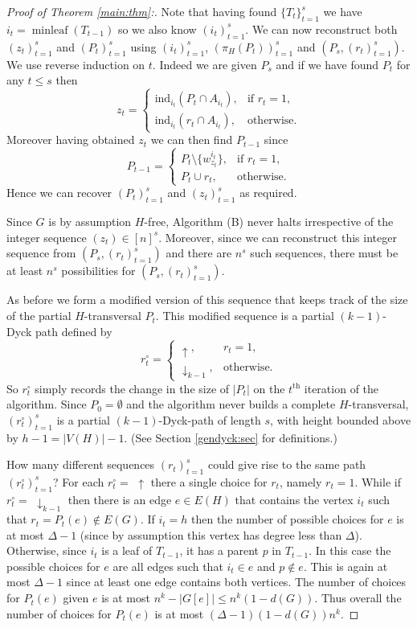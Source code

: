 \documentclass[12]{article}
\def\tr{\textrm}
\def\ind{\mathrm{ind}}
\def\dycku{\uparrow}
\def\dyckk{\downarrow_{k-1}}
\DeclareMathOperator{\minl}{minleaf}
\begin{document}
\begin{proof}[Proof of Theorem \ref{main:thm}:]
Note that having found $\{T_t\}_{t=1}^s$  we have $i_t=\minl(T_{t-1})$ so we also know $(i_t)_{t=1}^s$.
We can now reconstruct both $(z_t)_{t=1}^s$ and $(P_t)_{t=1}^s$ using  $(i_t)_{t=1}^s$, $(\pi_H(P_t))_{t=1}^s$ and $(P_s,(r_t)_{t=1}^s)$. We use reverse induction on $t$.
Indeed we are given $P_s$ and if we have found $P_t$ for any  $t\leq s$ then 
\[
z_t=\left\{
\begin{array}{ll}
\ind_{i_t}(P_t\cap A_{i_t}),& \textrm{if }r_{t}=1,\\
\ind_{i_t}(r_t \cap A_{i_t}),&\textrm{otherwise.}
\end{array}\right.\]
Moreover having obtained $z_t$ we can then find $P_{t-1}$ since
\[
P_{t-1}=\left\{
\begin{array}{ll}
P_t\setminus \{w_{z_t}^{i_t}\},& \textrm{if }r_{t}=1,\\
P_t\cup r_t,&\textrm{otherwise.}
\end{array}\right.\]
Hence we can recover $(P_t)_{t=1}^s$ and $(z_t)_{t=1}^s$ as required.

Since $G$ is by assumption $H$-free, Algorithm (B) never halts irrespective of the integer sequence $(z_t)\in[n]^s$. Moreover, since we can reconstruct this integer sequence from $(P_s,(r_t)_{t=1}^s)$ and there are $n^s$ such sequences,  there must be at least $n^s$ possibilities for $(P_s,(r_t)_{t=1}^s)$. 

As before we form a modified version of this sequence that keeps track of the size of the partial $H$-transversal $P_t$. This modified sequence  is a partial $(k-1)$-Dyck path defined by \[
r^\circ_t=\left\{
\begin{array}{ll}
  \dycku,& r_t=1,\\
  \dyckk,& \textrm{otherwise.} \end{array}\right.\] So $r_t^\circ$ simply records the change in the size of $|P_t|$ on the $t^\tr{th}$ iteration of the algorithm. Since $P_0=\emptyset$ and the algorithm never builds a complete $H$-transversal, $(r_t^\circ)_{t=1}^s$ is a partial $(k-1)$-Dyck-path of length $s$, with height bounded above by $h-1=|V(H)|-1$. (See Section \ref{gendyck:sec} for definitions.)


How many different sequences $(r_t)_{t=1}^s$ could give rise to the same path $(r_t^\circ)_{t=1}^s$? For each $r_t^\circ=\,\,\dycku$ there a single choice for $r_t$, namely $r_t=1$. While if $r_t^\circ=\,\,\dyckk$ then there is an edge $e\in E(H)$ that contains the vertex $i_t$ such that $r_t=P_t(e)\not\in E(G)$. If $i_t=h$ then the number of possible choices for $e$ is at most $\Delta-1$ (since by assumption this vertex has degree less than $\Delta$). Otherwise, since  $i_t$ is a leaf of $T_{t-1}$, it has a parent $p$ in $T_{t-1}$. In this case the possible choices for $e$ are all edges such that $i_t\in e$ and $p\not\in e$. This is again at most $\Delta-1$ since at least one edge contains both vertices. The number of choices for $P_t(e)$ given $e$ is at most $n^k-|G[e]|\leq n^k(1-d(G))$. Thus overall the number of choices for $P_t(e)$ is at most $(\Delta-1)(1-d(G))n^k$.



\end{proof}
\end{document}

